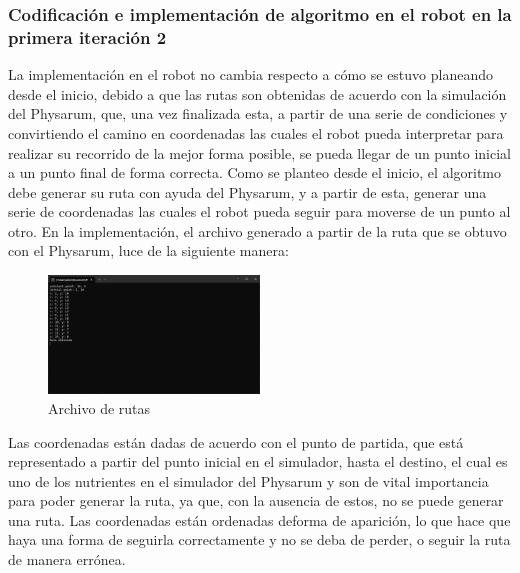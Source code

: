 \subsubsection{Codificaci\'on e implementaci\'on de algoritmo en el robot en la primera iteraci\'on 2}
    La implementaci\'on en el robot no cambia respecto a c\'omo se
        estuvo planeando desde el inicio, debido a que las rutas son
        obtenidas de acuerdo con la simulaci\'on del Physarum, que,
        una vez finalizada esta, a partir de una serie de condiciones y
        convirtiendo el camino en coordenadas las cuales el robot
        pueda interpretar para realizar su recorrido de la mejor forma
        posible, se pueda llegar de un punto inicial a un punto final
        de forma correcta.
        \vskip 0.5cm
    Como se planteo desde el inicio, el algoritmo debe generar
        su ruta con ayuda del Physarum, y a partir de esta, generar
        una serie de coordenadas las cuales el robot pueda seguir
        para moverse de un punto al otro. En la implementaci\'on, el
        archivo generado a partir de la ruta que se obtuvo con el
        Physarum, luce de la siguiente manera:
    \vskip 0.5cm
    \begin{figure}[htbp]
        \centering
        \includegraphics[width=0.5\textwidth]{./images/Pruebas/simulador/image043.png}
        \caption{Archivo de rutas}
        \label{fig:Archivo de rutas}
    \end{figure}
    \vskip 0.5cm
    Las coordenadas est\'an dadas de acuerdo con el punto de
        partida, que est\'a representado a partir del punto inicial en el
        simulador, hasta el destino, el cual es uno de los nutrientes
        en el simulador del Physarum y son de vital importancia para
        poder generar la ruta, ya que, con la ausencia de estos, no se
        puede generar una ruta. Las coordenadas est\'an ordenadas deforma de aparici\'on, lo que hace que haya una forma de
        seguirla correctamente y no se deba de perder, o seguir la
        ruta de manera err\'onea.